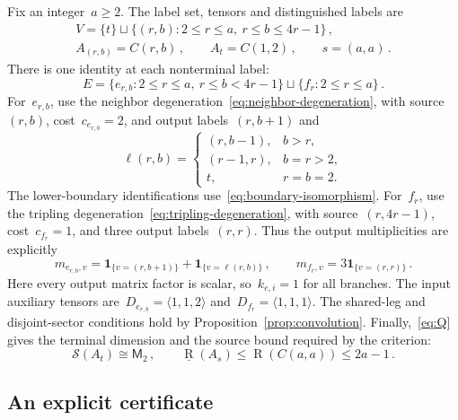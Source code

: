 \documentclass[11pt,letterpaper]{article}
\theoremstyle{definition}
\numberwithin{equation}{section}
\newcommand{\MM}{\mathsf M}
\newcommand{\R}{\operatorname{R}}
\newcommand{\br}{\underline{\operatorname{R}}}
\begin{document}
Fix an integer~$a\geq2$. The label set, tensors and distinguished labels are
\begin{equation*}
 \begin{gathered}
 V=\{t\}\sqcup\{(r,b):2\leq r\leq a,\ r\leq b\leq4r-1\}\,,\\
 A_{(r,b)}=C(r,b)\,,\qquad A_t=C(1,2)\,,\qquad s=(a,a)\,.
 \end{gathered}
\end{equation*}
There is one identity at each nonterminal label:
\begin{equation*}
 E=\{e_{r,b}:2\leq r\leq a,\ r\leq b<4r-1\}
 \sqcup\{f_r:2\leq r\leq a\}\,.
\end{equation*}
For~$e_{r,b}$, use the neighbor degeneration~\eqref{eq:neighbor-degeneration}, with source~$(r,b)$, cost~$c_{e_{r,b}}=2$, and output labels~$(r,b+1)$ and
\begin{equation*}
 \ell(r,b)=\begin{cases}
 (r,b-1),&b>r,\\
 (r-1,r),&b=r>2,\\
 t,&r=b=2.
 \end{cases}
\end{equation*}
The lower-boundary identifications use~\eqref{eq:boundary-isomorphism}. For~$f_r$, use the tripling degeneration~\eqref{eq:tripling-degeneration}, with source~$(r,4r-1)$, cost~$c_{f_r}=1$, and three output labels~$(r,r)$. Thus the output multiplicities are explicitly
\begin{equation*}
 m_{e_{r,b},v}=\mathbf1_{\{v=(r,b+1)\}}+\mathbf1_{\{v=\ell(r,b)\}}\,,\qquad
 m_{f_r,v}=3\mathbf1_{\{v=(r,r)\}}\,.
\end{equation*}
Here every output matrix factor is scalar, so~$k_{e,i}=1$ for all branches. The input auxiliary tensors are~$D_{e_{r,b}}=\langle1,1,2\rangle$ and~$D_{f_r}=\langle1,1,1\rangle$. The shared-leg and disjoint-sector conditions hold by Proposition~\ref{prop:convolution}. Finally,~\eqref{eq:Q} gives the terminal dimension and the source bound required by the criterion:
\begin{equation*}
 \mathcal S(A_t)\cong\MM_2\,,\qquad
 \br(A_s)\leq\R(C(a,a))\leq2a-1\,.
\end{equation*}

\subsection{An explicit certificate}
\label{sec:explicit-dual}
\end{document}
